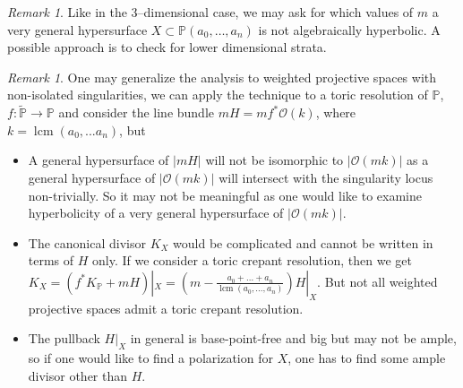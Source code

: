 \documentclass{amsart}
\theoremstyle{definition}
\theoremstyle{remark}
\newtheorem{remark}[theorem]{Remark}
\newcommand{\PP}{\mathbb{P}}
\begin{document}
\begin{remark}
Like in the 3–dimensional case, we may ask for which values of \(m\) a very general
hypersurface \(X \subset \PP(a_0,\ldots,a_n)\) is not algebraically hyperbolic.
A possible approach is to check for lower dimensional strata.

\end{remark}
\begin{remark}
    One may generalize the analysis to weighted projective spaces with non-isolated singularities, we can apply the technique to a toric resolution of $\mathbb P$, $f:\widetilde{\mathbb P}\to\mathbb P$ and consider the line bundle $mH=mf^*\mathcal O(k)$, where $k=\operatorname{lcm}(a_0,...a_n)$, but
    \begin{itemize}
        \item A general hypersurface of $|mH|$ will not be isomorphic to $|\mathcal O(mk)|$ as a general hypersurface of $|\mathcal O(mk)|$ will intersect with the singularity locus non-trivially. So it may not be meaningful as one would like to examine hyperbolicity of a very general hypersurface of $|\mathcal O(mk)|$. 
        \item The canonical divisor $K_X$ would be complicated and cannot be written in terms of $H$ only. If we consider a toric crepant resolution, then we get $K_X = (f^*K_\mathbb P+mH)|_X = (m-\frac{a_0+...+a_n}{\operatorname{lcm}(a_0,...,a_n)})H|_X$. But not all weighted projective spaces admit a toric crepant resolution.
        \item The pullback $H|_X$ in general is base-point-free and big but may not be ample, so if one would like to find a polarization for $X$, one has to find some ample divisor other than $H$.
    \end{itemize}
\end{remark}




\end{document}
